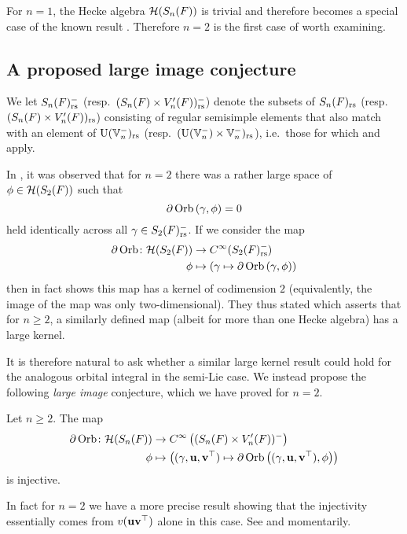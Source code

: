 \begin{remark}
  For $n = 1$, the Hecke algebra $\mathcal H(S_n(F))$ is trivial
  and therefore 
  becomes a special case of the known result \cite{ref:liuFJ}.
  Therefore $n=2$ is the first case of  worth examining.
\end{remark}

\subsection{A proposed large image conjecture}
\label{sec:intro_large_kernel}

We let $S_n(F)_{\mathrm{rs}}^-$ (resp.\ $(S_n(F) \times V'_n(F))_{\mathrm{rs}}^-$)
denote the subsets of $S_n(F)_{\mathrm{rs}}$ (resp.\ $(S_n(F) \times V'_n(F))_{\mathrm{rs}}$)
consisting of regular semisimple elements that also match with an element of
$\operatorname{U}(\mathbb V_n^-)_{\mathrm{rs}}$ (resp.\ $(\operatorname{U}(\mathbb V_n^-) \times \mathbb V_n^-)_{\mathrm{rs}}$),
i.e.\ those for which 
and  apply.

In \cite{ref:AFLspherical}, it was observed that for $n = 2$
there was a rather large space of $\phi \in \mathcal H(S_2(F))$ such that
\[ \partial \operatorname{Orb} \left(\gamma, \phi \right) = 0 \]
held identically across all $\gamma \in S_2(F)_{\mathrm{rs}}^-$.
If we consider the map
\begin{align*}
  \partial\operatorname{Orb} \colon \mathcal H(S_2(F)) &\to C^\infty(S_2(F)_{\mathrm{rs}}^-) \\
  \phi &\mapsto \left( \gamma \mapsto \partial \operatorname{Orb} \left(\gamma, \phi \right) \right)
\end{align*}
then \cite[Theorem 8.2.3]{ref:AFLspherical} in fact
shows this map has a kernel of codimension $2$
(equivalently, the image of the map was only two-dimensional).
They thus stated \cite[Conjecture 1.0.2]{ref:AFLspherical} which asserts that for $n \ge 2$,
a similarly defined map (albeit for more than one Hecke algebra) has a large kernel.

It is therefore natural to ask whether a similar large kernel result
could hold for the analogous orbital integral in the semi-Lie case.
We instead propose the following \emph{large image} conjecture,
which we have proved for $n = 2$.
\begin{conjecture}
  \label{conj:kernel_semi_lie}
  Let $n \ge 2$.
  The map
  \begin{align*}
    \partial\operatorname{Orb} \colon \mathcal H(S_n(F)) &\to C^\infty\left( (S_n(F) \times V'_n(F))^- \right) \\
    \phi &\mapsto \left( {(\gamma, \mathbf u, \mathbf v^\top)} \mapsto \partial \operatorname{Orb} \left({(\gamma, \mathbf u, \mathbf v^\top)}, \phi \right) \right)
  \end{align*}
  is injective.
\end{conjecture}
In fact for $n=2$ we have a more precise result
showing that the injectivity essentially comes from $v(\mathbf u\mathbf v^\top)$ alone in this case.
See  and  momentarily.

